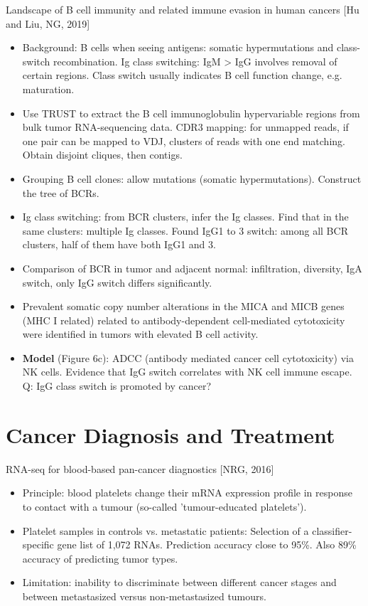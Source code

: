 \documentclass{report}
\begin{document}
Landscape of B cell immunity and related immune evasion in human cancers [Hu and Liu, NG, 2019]
\begin{itemize}
	\item Background: B cells when seeing antigens: somatic hypermutations and class-switch recombination. Ig class switching: IgM > IgG involves removal of certain regions. Class switch usually indicates B cell function change, e.g. maturation.
	
	\item Use TRUST to extract the B cell immunoglobulin hypervariable regions from bulk tumor RNA-sequencing data. CDR3 mapping: for unmapped reads, if one pair can be mapped to VDJ, clusters of reads with one end matching. Obtain disjoint cliques, then contigs.
	
	\item Grouping B cell clones: allow mutations (somatic hypermutations). Construct the tree of BCRs.
	
	\item Ig class switching: from BCR clusters, infer the Ig classes. Find that in the same clusters: multiple Ig classes. Found IgG1 to 3 switch: among all BCR clusters, half of them have both IgG1 and 3.
	
	\item Comparison of BCR in tumor and adjacent normal: infiltration, diversity, IgA switch, only IgG switch differs significantly.
	
	\item Prevalent somatic copy number alterations in the MICA and MICB genes (MHC I related) related to antibody-dependent cell-mediated cytotoxicity were identified in tumors with elevated B cell activity.
	
	\item \textbf{Model} (Figure 6c): ADCC (antibody mediated cancer cell cytotoxicity) via NK cells. Evidence that IgG switch correlates with NK cell immune escape. Q: IgG class switch is promoted by cancer?
\end{itemize}
\chapter{Cancer Diagnosis and Treatment}

RNA-seq for blood-based pan-cancer diagnostics [NRG, 2016]
\begin{itemize}
	\item Principle:  blood platelets change their mRNA expression profile in response to contact with a tumour (so-called 'tumour-educated platelets'). 
	
	\item Platelet samples in controls vs. metastatic patients: Selection of a classifier-specific gene list of 1,072 RNAs. Prediction accuracy close to 95\%. Also 89\% accuracy of predicting tumor types. 
	
	\item Limitation: inability to discriminate between different cancer stages and between metastasized versus non-metastasized tumours.
\end{itemize}
\end{document}
